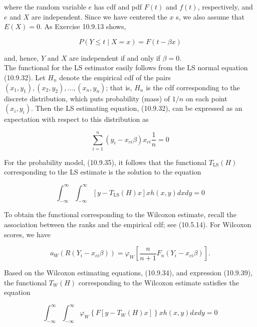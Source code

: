 where the random variable $e$ has cdf and pdf $F(t)$ and $f(t)$, respectively, and $e$ and $X$ are independent. Since we have centered the $x$ s, we also assume that $E(X)=0$. As Exercise 10.9.13 shows,


\begin{equation*}
P(Y \leq t \mid X=x)=F(t-\beta x) \tag{10.9.36}
\end{equation*}


and, hence, $Y$ and $X$ are independent if and only if $\beta=0$.\\
The functional for the LS estimator easily follows from the LS normal equation (10.9.32). Let $H_{n}$ denote the empirical cdf of the pairs $\left(x_{1}, y_{1}\right),\left(x_{2}, y_{2}\right), \ldots,\left(x_{n}, y_{n}\right)$; that is, $H_{n}$ is the cdf corresponding to the discrete distribution, which puts probability (mass) of $1 / n$ on each point $\left(x_{i}, y_{i}\right)$. Then the LS estimating equation, (10.9.32), can be expressed as an expectation with respect to this distribution as


\begin{equation*}
\sum_{i=1}^{n}\left(y_{i}-x_{c i} \beta\right) x_{c i} \frac{1}{n}=0 \tag{10.9.37}
\end{equation*}


For the probability model, (10.9.35), it follows that the functional $T_{\mathrm{LS}}(H)$ corresponding to the LS estimate is the solution to the equation


\begin{equation*}
\int_{-\infty}^{\infty} \int_{-\infty}^{\infty}\left[y-T_{\mathrm{LS}}(H) x\right] x h(x, y) d x d y=0 \tag{10.9.38}
\end{equation*}


To obtain the functional corresponding to the Wilcoxon estimate, recall the association between the ranks and the empirical cdf; see (10.5.14). For Wilcoxon scores, we have


\begin{equation*}
a_{W}\left(R\left(Y_{i}-x_{c i} \beta\right)\right)=\varphi_{W}\left[\frac{n}{n+1} F_{n}\left(Y_{i}-x_{c i} \beta\right)\right] . \tag{10.9.39}
\end{equation*}


Based on the Wilcoxon estimating equations, (10.9.34), and expression (10.9.39), the functional $T_{W}(H)$ corresponding to the Wilcoxon estimate satisfies the equation


\begin{equation*}
\int_{-\infty}^{\infty} \int_{-\infty}^{\infty} \varphi_{W}\left\{F\left[y-T_{W}(H) x\right]\right\} x h(x, y) d x d y=0 \tag{10.9.40}
\end{equation*}


